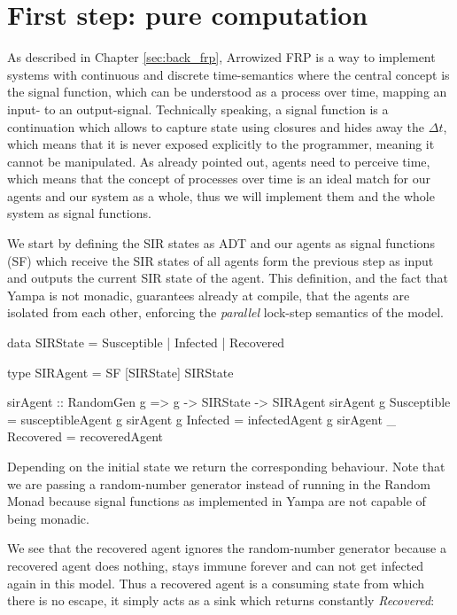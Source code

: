 \section{First step: pure computation}
\label{sec:timedriven_firststep}
As described in Chapter \ref{sec:back_frp}, Arrowized FRP \cite{hughes_generalising_2000} is a way to implement systems  with continuous and discrete time-semantics where the central concept is the signal function, which can be understood as a process over time, mapping an input- to an output-signal. Technically speaking, a signal function is a continuation which allows to capture state using closures and hides away the $\Delta t$, which means that it is never exposed explicitly to the programmer, meaning it cannot be manipulated. As already pointed out, agents need to perceive time, which means that the concept of processes over time is an ideal match for our agents and our system as a whole, thus we will implement them and the whole system as signal functions.

We start by defining the SIR states as ADT and our agents as signal functions (SF) which receive the SIR states of all agents form the previous step as input and outputs the current SIR state of the agent. This definition, and the fact that Yampa is not monadic, guarantees already at compile, that the agents are isolated from each other, enforcing the \textit{parallel} lock-step semantics of the model.

\begin{HaskellCode}
data SIRState = Susceptible | Infected | Recovered

type SIRAgent = SF [SIRState] SIRState 

sirAgent :: RandomGen g => g -> SIRState -> SIRAgent
sirAgent g Susceptible = susceptibleAgent g
sirAgent g Infected    = infectedAgent g
sirAgent _ Recovered   = recoveredAgent
\end{HaskellCode}

Depending on the initial state we return the corresponding behaviour. Note that we are passing a random-number generator instead of running in the Random Monad because signal functions as implemented in Yampa are not capable of being monadic. 

We see that the recovered agent ignores the random-number generator because a recovered agent does nothing, stays immune forever and can not get infected again in this model. Thus a recovered agent is a consuming state from which there is no escape, it simply acts as a sink which returns constantly \textit{Recovered}:

